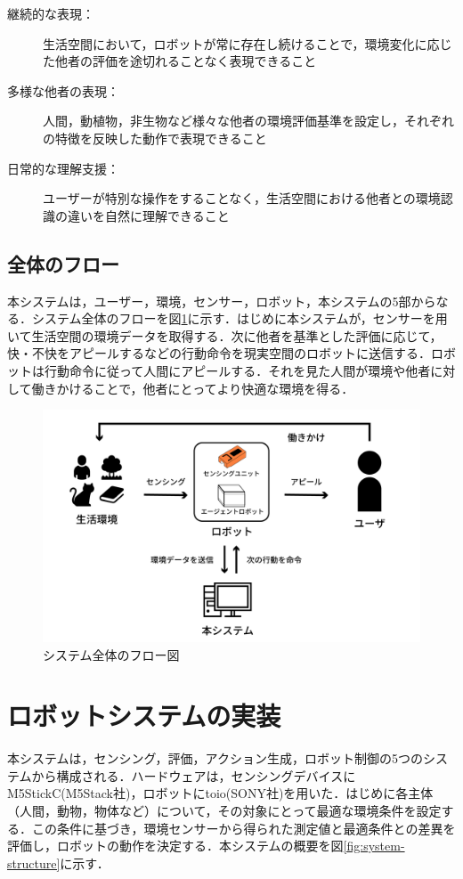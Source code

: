 \documentclass[paper=a4paper,jafontsize=9pt,head_space=15mm,gutter=20mm,
twocolumn,number_of_lines=49, line_length=26zw]{myuarticle}
\begin{document}
\begin{description}
  \item[継続的な表現：]生活空間において，ロボットが常に存在し続けることで，環境変化に応じた他者の評価を途切れることなく表現できること
  \item[多様な他者の表現：]人間，動植物，非生物など様々な他者の環境評価基準を設定し，それぞれの特徴を反映した動作で表現できること
  \item[日常的な理解支援：]ユーザーが特別な操作をすることなく，生活空間における他者との環境認識の違いを自然に理解できること
\end{description}

\subsection{全体のフロー}
本システムは，ユーザー，環境，センサー，ロボット，本システムの5部からなる．システム全体のフローを図\ref{fig:system-flow}に示す．はじめに本システムが，センサーを用いて生活空間の環境データを取得する．次に他者を基準とした評価に応じて，快・不快をアピールするなどの行動命令を現実空間のロボットに送信する．ロボットは行動命令に従って人間にアピールする．それを見た人間が環境や他者に対して働きかけることで，他者にとってより快適な環境を得る．

\begin{figure}[h]
  \centering
  \includegraphics[keepaspectratio,width=1.0\columnwidth]{resources/system_flow.png}
  \caption{システム全体のフロー図}
  \label{fig:system-flow}
\end{figure}

\section{ロボットシステムの実装}
本システムは，センシング，評価，アクション生成，ロボット制御の5つのシステムから構成される．ハードウェアは，センシングデバイスにM5StickC(M5Stack社)，ロボットにtoio(SONY社)を用いた．はじめに各主体（人間，動物，物体など）について，その対象にとって最適な環境条件を設定する．この条件に基づき，環境センサーから得られた測定値と最適条件との差異を評価し，ロボットの動作を決定する．本システムの概要を図\ref{fig:system-structure}に示す．
\end{document}
